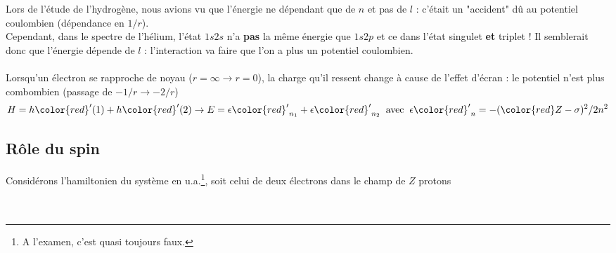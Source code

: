 Lors de l'étude de l'hydrogène, nous avions vu que l'énergie ne dépendant que de $n$ et pas de 
$l$ : c'était un "accident" dû au potentiel coulombien (dépendance en $1/r$).\\

 Cependant, dans le 
spectre de l'hélium, l'état $1s2s$ n'a \textbf{pas} la même énergie que $1s2p$ et ce dans l'état
singulet \textbf{et} triplet ! Il semblerait donc que l'énergie dépende de $l$ : l'interaction 
va faire que l'on a plus un potentiel coulombien.\\
\ \\

Lorsqu'un électron se rapproche de noyau ($r=\infty\to r=0$), la charge qu'il ressent change à 
cause de l'effet d'écran : le potentiel n'est plus combombien (passage de $-1/r\to -2/r$)
\begin{equation}
H = h {\color{red} '} (1) 
+ h {\color{red} '} (2) \rightarrow E 
= \epsilon{\color{red} '} _{n_1} 
+ \epsilon{\color{red} '} _{n_2}
\; \; \mbox{avec} \; \; \epsilon{\color{red} '}_n 
= - ({\color{red} Z - \sigma})^2 / 2n^2
\end{equation}

\subsection{Rôle du spin}
Considérons l'hamiltonien du système en u.a.\footnote{A l'examen, c'est quasi toujours faux.}, soit 
celui de deux électrons dans le champ de $Z$ protons\ \\
\\\

